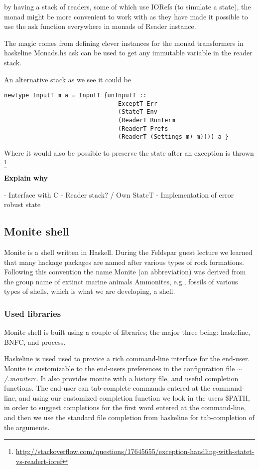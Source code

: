 \documentclass[11pt,a4paper]{article}
\begin{document}
by having a stack of readers, some of which use IORefs (to simulate a state), the
monad might be more convenient to work with as they have made it possible to
use the ask function everywhere in monads of Reader instance.

The magic comes from defining clever instances for the monad transformers in
haskeline Monads.hs ask can be used to get any immutable variable in the reader
stack.

An alternative stack as we see it could be

\begin{verbatim}
newtype InputT m a = InputT {unInputT ::
                                ExceptT Err
                                (StateT Env
                                (ReaderT RunTerm
                                (ReaderT Prefs
                                (ReaderT (Settings m) m)))) a }
\end{verbatim}

Where it would also be possible to preserve the state after an exception is
thrown \footnote{\url{http://stackoverflow.com/questions/17645655/exception-handling-with-statet-vs-readert-ioref}}

\textbf{Explain why}

- Interface with C
- Reader stack? / Own StateT
- Implementation of error robust state


\subsection{Monite shell}
\label{monite}

Monite is a shell written in Haskell. During the Feldspar guest lecture we
learned that many hackage packages are named after various types of rock
formations. Following this convention the name Monite (an abbreviation) was
derived from the group name of extinct marine animals Ammonites, e.g., fossils
of various types of shells, which is what we are developing, a shell.

\subsubsection{Used libraries}

Monite shell is built using a couple
of libraries; the major three being: haskeline, BNFC, and process.

Haskeline is used used to provice a rich command-line interface for the
end-user. Monite is customizable to the end-users preferences in the
configuration file $\mathtt{\sim}$\textit{/.moniterc}. It also provides monite
with a history file, and useful completion functions. The end-user can
tab-complete commands entered at the command-line, and using our customized
completion function we look in the users \$PATH, in order to suggest completions
for the first word entered at the command-line, and then we use the standard
file completion from haskeline for tab-completion of the arguments.
\end{document}

